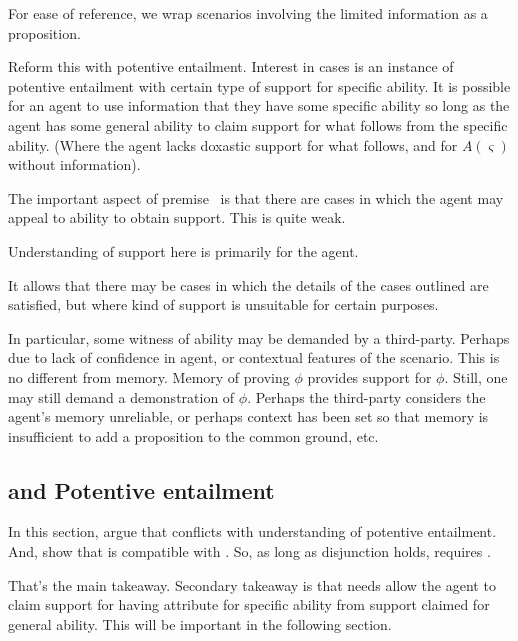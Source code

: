 \begin{note}
  For ease of reference, we wrap scenarios involving the limited information as a proposition.
  \begin{proposition}[\eA{}]\label{prem:ab}
    {
      {\color{red}
        Reform this with potentive entailment.
      }
      Interest in cases is an instance of potentive entailment with certain type of support for specific ability.
    }
    It is possible for an agent to use information that they have some specific ability so long as the agent has some general ability to claim support for what follows from the specific ability.
    (Where the agent lacks doxastic support for what follows, and for \(A(\varsigma)\) without information).
  \end{proposition}
\end{note}

\begin{note}
  The important aspect of premise~\eA{} is that there are cases in which the agent may appeal to ability to obtain support.
  This is quite weak.

  Understanding of support here is primarily for the agent.

  It allows that there may be cases in which the details of the cases outlined are satisfied, but where kind of support is unsuitable for certain purposes.
\end{note}

\begin{note}
  In particular, some witness of ability may be demanded by a third-party.
  Perhaps due to lack of confidence in agent, or contextual features of the scenario.
  This is no different from memory.
  Memory of proving \(\phi\) provides support for \(\phi\).
  Still, one may still demand a demonstration of \(\phi\).
  Perhaps the third-party considers the agent's memory unreliable, or perhaps context has been set so that memory is insufficient to add a proposition to the common ground, etc.
\end{note}

\subsection{\uRa{} and Potentive entailment}
\label{sec:first-conditional}

\begin{note}[Summary]
  In this section, argue that \uRa{} conflicts with \WR{} understanding of potentive entailment.
  And, show that \AR{} is compatible with \uRa{}.
  So, as long as disjunction holds, \uRa{} requires \AR{}.

  That's the main takeaway.
  Secondary takeaway is that \gsi{} needs allow the agent to claim support for having attribute for specific ability from support claimed for general ability.
  This will be important in the following section.
\end{note}

